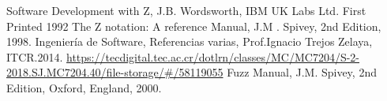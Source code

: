 \documentclass[12pt,a4paper]{article}
\begin{document}
\newpage
\begin{thebibliography}{00}
 Software Development with Z, J.B. Wordsworth, IBM UK Labs Ltd. First Printed 1992
 The Z notation: A reference Manual, J.M . Spivey, 2nd Edition, 1998.
 Ingeniería de Software, Referencias varias, Prof.Ignacio Trejos Zelaya, ITCR.2014. \url{https://tecdigital.tec.ac.cr/dotlrn/classes/MC/MC7204/S-2-2018.SJ.MC7204.40/file-storage/#/58119055}
 Fuzz Manual, J.M. Spivey, 2nd Edition, Oxford, England, 2000.
\end{thebibliography}
\end{document}
